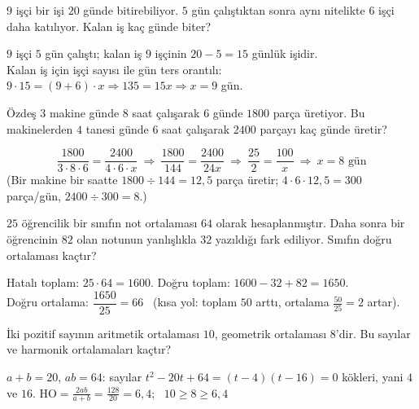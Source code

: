 \begin{alistirma}
\(9\) işçi bir işi \(20\) günde bitirebiliyor. \(5\) gün çalıştıktan sonra aynı nitelikte \(6\) işçi daha katılıyor. Kalan iş kaç günde biter?
\end{alistirma}
\begin{cozum}
\(9\) işçi \(5\) gün çalıştı; kalan iş \(9\) işçinin \(20-5=15\) günlük işidir.\\
Kalan iş için işçi sayısı ile gün ters orantılı: \(9\cdot 15=(9+6)\cdot x\Rightarrow 135=15x\Rightarrow x=9\) gün.
\end{cozum}

\begin{alistirma}
Özdeş \(3\) makine günde \(8\) saat çalışarak \(6\) günde \(1800\) parça üretiyor. Bu makinelerden \(4\) tanesi günde \(6\) saat çalışarak \(2400\) parçayı kaç günde üretir?
\end{alistirma}
\begin{cozum}
\[\frac{1800}{3\cdot 8\cdot 6}=\frac{2400}{4\cdot 6\cdot x}\ \Rightarrow\ \frac{1800}{144}=\frac{2400}{24x}\ \Rightarrow\ \frac{25}{2}=\frac{100}{x}\ \Rightarrow\ x=8\text{ gün}\]
(Bir makine bir saatte \(1800\div 144=12{,}5\) parça üretir; \(4\cdot 6\cdot 12{,}5=300\) parça/gün, \(2400\div 300=8\).)
\end{cozum}

\begin{alistirma}
\(25\) öğrencilik bir sınıfın not ortalaması \(64\) olarak hesaplanmıştır. Daha sonra bir öğrencinin \(82\) olan notunun yanlışlıkla \(32\) yazıldığı fark ediliyor. Sınıfın doğru ortalaması kaçtır?
\end{alistirma}
\begin{cozum}
Hatalı toplam: \(25\cdot 64=1600\). Doğru toplam: \(1600-32+82=1650\).\\
Doğru ortalama: \(\dfrac{1650}{25}=66\) \ (kısa yol: toplam \(50\) arttı, ortalama \(\frac{50}{25}=2\) artar).
\end{cozum}

\begin{alistirma}
İki pozitif sayının aritmetik ortalaması \(10\), geometrik ortalaması \(8\)'dir. Bu sayılar ve harmonik ortalamaları kaçtır?
\end{alistirma}
\begin{cozum}
\(a+b=20\), \(ab=64\): sayılar \(t^2-20t+64=(t-4)(t-16)=0\) kökleri, yani \(4\) ve \(16\).
\(\text{HO}=\frac{2ab}{a+b}=\frac{128}{20}=6{,}4\); \ \(10\ge 8\ge 6{,}4\) \checkmark
\end{cozum}

